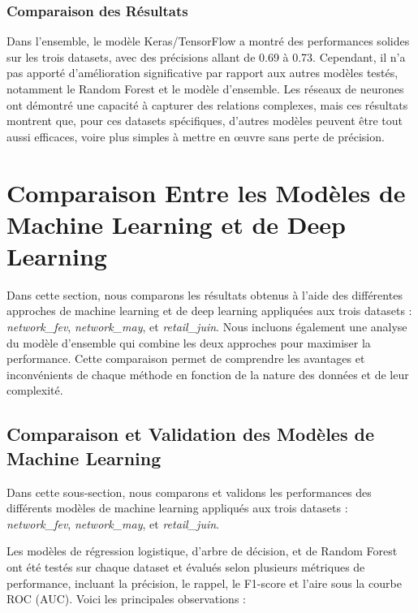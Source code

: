 \subsubsection{Comparaison des Résultats}

Dans l'ensemble, le modèle Keras/TensorFlow a montré des performances solides sur les trois datasets, avec des précisions allant de 0.69 à 0.73. Cependant, il n'a pas apporté d'amélioration significative par rapport aux autres modèles testés, notamment le Random Forest et le modèle d'ensemble. Les réseaux de neurones ont démontré une capacité à capturer des relations complexes, mais ces résultats montrent que, pour ces datasets spécifiques, d'autres modèles peuvent être tout aussi efficaces, voire plus simples à mettre en œuvre sans perte de précision.


\section{Comparaison Entre les Modèles de Machine Learning et de Deep Learning}

Dans cette section, nous comparons les résultats obtenus à l'aide des différentes approches de machine learning et de deep learning appliquées aux trois datasets : \textit{network\_fev}, \textit{network\_may}, et \textit{retail\_juin}. Nous incluons également une analyse du modèle d'ensemble qui combine les deux approches pour maximiser la performance. Cette comparaison permet de comprendre les avantages et inconvénients de chaque méthode en fonction de la nature des données et de leur complexité.

\subsection{Comparaison et Validation des Modèles de Machine Learning}

Dans cette sous-section, nous comparons et validons les performances des différents modèles de machine learning appliqués aux trois datasets : \textit{network\_fev}, \textit{network\_may}, et \textit{retail\_juin}. 

Les modèles de régression logistique, d'arbre de décision, et de Random Forest ont été testés sur chaque dataset et évalués selon plusieurs métriques de performance, incluant la précision, le rappel, le F1-score et l'aire sous la courbe ROC (AUC). Voici les principales observations :

